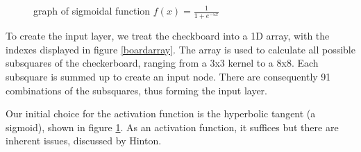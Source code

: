 \documentclass[12pt,a4paper]{article}
\begin{document}
    \begin{figure}
        \centering
        \caption{graph of sigmoidal function $f(x)=\frac{1}{1+e^{-5x}}$ \label{sigmoid}}
        
    \end{figure}


    To create the input layer, we treat the checkboard into a 1D array, with the indexes displayed in figure \ref{boardarray}. The array is used to calculate all possible subsquares of the checkerboard, ranging from a 3x3 kernel to a 8x8. Each subsquare is summed up to create an input node. There are consequently 91 combinations of the subsquares, thus forming the input layer. 

    Our initial choice for the activation function is the hyperbolic tangent (a sigmoid), shown in figure \ref{sigmoid}. As an activation function, it suffices but there are inherent issues, discussed by Hinton.
    
\end{document}
